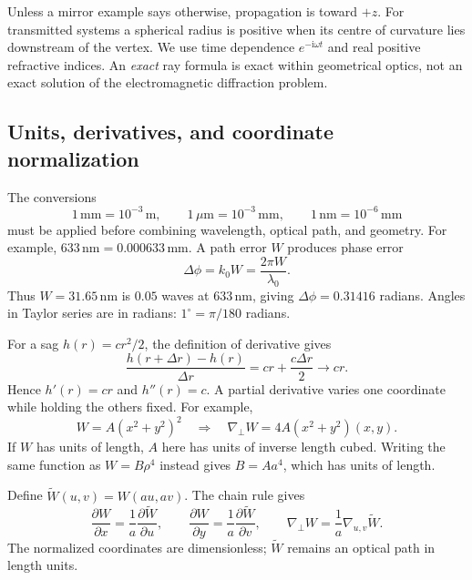 \documentclass[11pt,a4paper]{article}
\numberwithin{equation}{section}
\newcommand{\ii}{\mathrm{i}}
\newcommand{\gradp}{\nabla_{\!\perp}}
\newcommand{\mm}{\,\mathrm{mm}}
\newcommand{\nm}{\,\mathrm{nm}}
\newcommand{\um}{\,\mu\mathrm{m}}
\begin{document}
Unless a mirror example says otherwise, propagation is toward $+z$.
For transmitted systems a spherical radius is positive when its centre of
curvature lies downstream of the vertex. We use time dependence
$e^{-\ii\omega t}$ and real positive refractive indices. An \emph{exact} ray
formula is exact within geometrical optics, not an exact solution of the
electromagnetic diffraction problem.

\subsection{Units, derivatives, and coordinate normalization}
The conversions
\[
1\mm=10^{-3}\,\mathrm m,\qquad 1\um=10^{-3}\mm,\qquad
1\nm=10^{-6}\mm
\]
must be applied before combining wavelength, optical path, and geometry.
For example, $633\nm=0.000633\mm$. A path error $W$ produces phase error
\begin{equation}
 \Delta\phi=k_0W=\frac{2\pi W}{\lambda_0}.
\end{equation}
Thus $W=31.65\nm$ is $0.05$ waves at $633\nm$, giving
$\Delta\phi=0.31416$ radians. Angles in Taylor series are in radians:
$1^\circ=\pi/180$ radians.

For a sag $h(r)=cr^2/2$, the definition of derivative gives
\[
 \frac{h(r+\Delta r)-h(r)}{\Delta r}
 =cr+\frac{c\Delta r}{2}\longrightarrow cr.
\]
Hence $h'(r)=cr$ and $h''(r)=c$. A partial derivative varies one coordinate
while holding the others fixed. For example,
\begin{equation}
 W=A(x^2+y^2)^2
 \quad\Longrightarrow\quad
 \gradp W=4A(x^2+y^2)(x,y).
\end{equation}
If $W$ has units of length, $A$ here has units of inverse length cubed.
Writing the same function as $W=B\rho^4$ instead gives $B=Aa^4$,
which has units of length.

Define $\widetilde W(u,v)=W(au,av)$. The chain rule gives
\begin{equation}
 \frac{\partial W}{\partial x}
 =\frac1a\frac{\partial\widetilde W}{\partial u},
 \qquad
 \frac{\partial W}{\partial y}
 =\frac1a\frac{\partial\widetilde W}{\partial v},
 \qquad
 \gradp W=\frac1a\nabla_{u,v}\widetilde W.
 \label{eq:normalization}
\end{equation}
The normalized coordinates are dimensionless; $\widetilde W$ remains an
optical path in length units.
\end{document}
